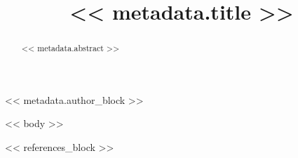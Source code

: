 \documentclass[runningheads]{llncs}
\begin{document}
%
\title{<< metadata.title >>}
%
%
<< metadata.author_block >>
%
%
%
\maketitle              %
%
\begin{abstract}
<< metadata.abstract >>
\end{abstract}

<< body >>


% 
%
<< references_block >>
\end{document}
